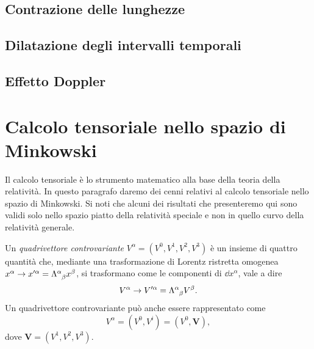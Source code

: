 \subsection{Contrazione delle lunghezze}
\label{sec:contrazione-lunghezze}

\subsection{Dilatazione degli intervalli temporali}
\label{sec:dilatazione-tempo}

\subsection{Effetto Doppler}
\label{sec:effetto-doppler}

\section{Calcolo tensoriale nello spazio di Minkowski}
\label{sec:calcolo-tensoriale}

Il calcolo tensoriale è lo strumento matematico alla base della teoria della
relatività.  In questo paragrafo daremo dei cenni relativi al calcolo tensoriale
nello spazio di Minkowski.  Si noti che alcuni dei risultati che presenteremo
qui sono validi solo nello spazio piatto della relatività speciale e non in
quello curvo della relatività generale.

Un \emph{quadrivettore controvariante}
$V^{\alpha} = (V^{0}, V^{1}, V^{2}, V^{3})$ è un insieme di quattro quantità
che, mediante una trasformazione di Lorentz ristretta omogenea
$x^{\alpha} \to x'^{\alpha} = \tensor{\Lambda}{^{\alpha}_{\beta}}x^{\beta}$, si
trasformano come le componenti di $\dd x^{\alpha}$, vale a dire
\begin{equation}
  V^{\alpha} \to V'^{\alpha} = \tensor{\Lambda}{^{\alpha}_{\beta}}V^{\beta}.
\end{equation}
Un quadrivettore controvariante può anche essere rappresentato come
\begin{equation}
  V^{\alpha} = (V^{0}, V^{i}) = (V^{0}, \bm{V}),
\end{equation}
dove $\bm{V} = (V^{1}, V^{2}, V^{3})$.


